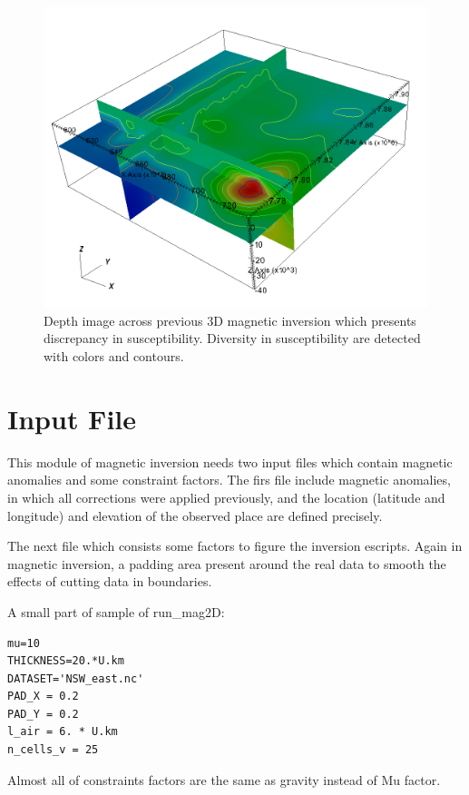 \begin{figure}
\centering
\includegraphics[width=\textwidth]{sus3D.png}
\caption{Depth image across previous 3D magnetic inversion which presents discrepancy in susceptibility. Diversity in susceptibility are detected with colors and contours.}
\end{figure}

\section{Input File} 

This module of magnetic inversion needs two input files which contain magnetic anomalies and some constraint factors. The firs file include magnetic anomalies, in which all corrections were applied previously, and the location (latitude and longitude) and elevation of the observed place are defined precisely.

The next file which consists some factors to figure the inversion escripts. Again in magnetic inversion, a padding area present around the real data to smooth the effects of cutting data in boundaries.
 
A small part of sample of run_mag2D:

\begin{verbatim}
mu=10
THICKNESS=20.*U.km
DATASET='NSW_east.nc'
PAD_X = 0.2
PAD_Y = 0.2
l_air = 6. * U.km
n_cells_v = 25
\end{verbatim}

Almost all of constraints factors are the same as gravity instead of Mu factor.\\

